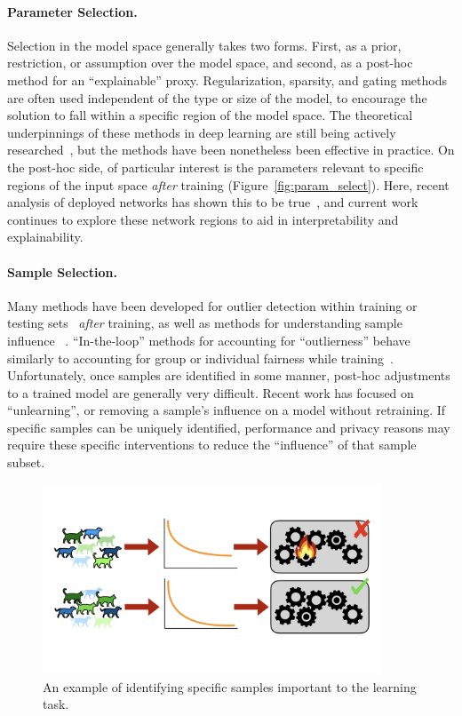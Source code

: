\paragraph{Parameter Selection.} 
Selection in the model space generally takes two forms. First, as a prior, restriction, or assumption over the model space, and second, as a post-hoc method for an ``explainable'' proxy.
Regularization, sparsity, and gating methods are often used independent of the type or size of the model, to encourage the solution to fall within a specific region of the model space.
The theoretical underpinnings of these methods in deep learning are still being actively researched~\citep{hardt2016train,jacot2018neural,neyshabur2014search}, but the methods have been nonetheless been effective in practice. 
On the post-hoc side, of particular interest is the parameters relevant to specific regions of the input space \textit{after} training (Figure~\ref{fig:param_select}). Here, recent analysis of deployed networks has shown this to be true~\citep{bau2017network,fong2018net2vec}, and current work continues to explore these network regions to aid in interpretability and explainability.

\paragraph{Sample Selection.} Many methods have been developed for outlier detection within training or testing sets~\citep{huang2020feature,ren2019likelihood} \textit{after} training, as well as methods for understanding sample influence~\citep{abc} . ``In-the-loop'' methods for accounting for ``outlierness'' behave similarly to accounting for group or individual fairness while training~\cite{mehrabi2021survey}. Unfortunately, once samples are identified in some manner, post-hoc adjustments to a trained model are generally very difficult. Recent work has focused on ``unlearning'', or removing a sample's influence on a model without retraining. If specific samples can be uniquely identified, performance and privacy reasons may require these specific interventions to reduce the ``influence'' of that sample subset.
\begin{figure}
    \centering
    \includegraphics[trim={0 4.5cm 0 4cm},clip,width=0.9\textwidth]{diss/1_intro/figs/sample_select.png}
    \caption[Visualization of sample selection]{An example of identifying specific samples important to the learning task.}
    \label{fig:sample_select}
\end{figure}



